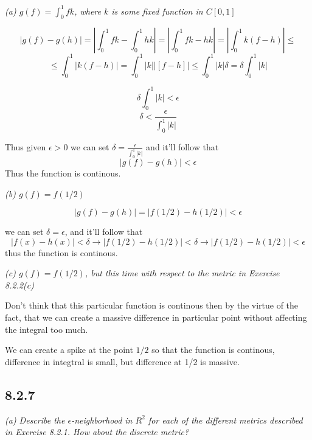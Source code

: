 \documentclass[11pt,oneside,titlepage]{book}
\begin{document}
\textit{(a) $g(f) = \int_0^1{f k}$, where $k$ is some fixed function in $C[0, 1]$}



$$|g(f) - g(h)| = \left| \int_0^1 {f k} - \int_0^1{h k}\right| =
\left| \int_0^1 {f k - h k}\right| = \left| \int_0^1 {k(f - h)}\right| \leq
$$
$$ \leq \int_0^1 {|k(f - h)|} = \int_0^1 {|k||[f - h]|} \leq \int_0^1 {|k| \delta } =
\delta \int_0^1 {|k|}$$

$$\delta \int_0^1 {|k|} < \epsilon$$
$$\delta  < \frac{\epsilon}{\int_0^1 {|k|}}$$

Thus given $\epsilon > 0$ we can set $\delta = \frac{\epsilon}{\int_0^1 {|k|}}$ and it'll follow
that
$$|g(f) - g(h)| < \epsilon$$
Thus the function is continous.

\textit{(b) $g(f) = f(1/2)$}

$$|g(f) - g(h)| = |f(1/2) - h(1/2)| < \epsilon$$

we can set $\delta = \epsilon$, and it'll follow that
$$|f(x) - h(x)| < \delta \to |f(1/2) - h(1/2)| < \delta \to |f(1/2) - h(1/2)| < \epsilon$$
thus the function is continous.

\textit{(c) $g(f) = f(1/2)$, but this time with respect to the metric in Exercise 8.2.2(c)}

Don't think that this particular function is continous then by the virtue of the fact, that
we can create a massive difference in particular point without affecting the integral too much.

We can create a spike at the point $1/2$ so that the function is continous, difference in
integtral is small, but difference at 1/2 is massive.

\subsection*{8.2.7}
\textit{(a) Describe the $\epsilon$-neighborhood in $R^2$ for each of the different metrics
  described in Exercise 8.2.1. How about the discrete metric?}
\end{document}
